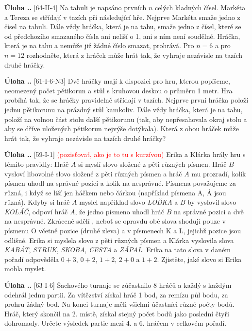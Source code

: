 \documentclass{article}
\newcounter{seminar}
\newcounter{problem}
\newcommand\todo[1]{\noindent\textcolor{red}{(#1)}}
\newcommand{\problem}[3]{
  \stepcounter{problem}
  \noindent\textbf{Úloha \theseminar .\theproblem.}
    [#1] #2
  \noindent#3
  \bigskip
}
\begin{document}
\problem{64-II-4}{
Na tabuli je napsáno prvních $n$ celých kladných čísel. Markéta a Tereza se střídají v tazích při následující hře. Nejprve Markéta smaže jedno z čísel na tabuli. Dále vždy hráčka, která je na tahu, smaže jedno z čísel, které se od předchozího smazaného čísla ani neliší o 1, ani s ním není soudělné. Hráčka, která je na tahu a nemůže již žádné číslo smazat, prohrává. Pro $n = 6$ a pro $n = 12$ rozhodněte, která z hráček může hrát tak, že vyhraje nezávisle na tazích druhé hráčky.
}{
}

\problem{61-I-6-N3}{
Dvě hráčky mají k dispozici pro hru, kterou popíšeme, neomezený počet pětikorun a stůl s kruhovou deskou o průměru 1 metr. Hra probíhá tak, že se hráčky pravidelně střídají v tazích. Nejprve první hráčka položí jednu pětikorunu na prázdný stůl kamkoliv. Dále vždy hráčka, která je na tahu, položí na volnou část stolu další pětikorunu (tak, aby nepřesahovala okraj stolu a aby se dříve uložených pětikorun nejvýše dotýkala). Která z obou hráček může hrát tak, že vyhraje nezávisle na tazích druhé hráčky?
}{
}

\problem{59-I-1}{
\todo{pozisťovať, ako je to tu s kurzívou} Erika a Klárka hrály hru \uv{slovní logik} s těmito pravidly: Hráč $A$ si myslí slovo složené z pěti různých písmen. Hráč $B$ vysloví libovolné slovo složené z pěti různých písmen a hráč $A$ mu prozradí, kolik písmen uhodl na správné pozici a kolik na nesprávné. Písmena považujeme za různá, i když se liší jen háčkem nebo čárkou (například písmena A, Á jsou různá). Kdyby si hráč $A$ myslel například slovo \textit{LOĎKA} a $B$ by vyslovil slovo \textit{KOLÁČ}, odpoví hráč $A$, že jedno písmeno uhodl hráč $B$ na správné pozici a dvě na nesprávné. Zkráceně sdělí \uv{1 + 2}, neboť se opravdu obě slova shodují pouze v písmenu O včetně pozice (druhé zleva) a v písmenech K a L, jejichž pozice jsou odlišné. Erika si myslela slovo z pěti různých písmen a Klárka vyslovila slova \textit{KABÁT}, \textit{STRUK}, \textit{SKOBA}, \textit{CESTA} a \textit{ZÁPAL}. Erika na tato slova v daném pořadí odpověděla $0 + 3$, $0 + 2$, $1 + 2$, $2 + 0$ a $1 + 2$. Zjistěte, jaké slovo si Erika mohla myslet.
}{
}

\problem{63-I-6}{
Šachového turnaje se zúčastnilo 8 hráčů a každý s každým odehrál jednu partii. Za vítězství získal hráč 1 bod, za remízu půl bodu, za prohru žádný bod. Na konci turnaje měli všichni účastníci různé počty bodů. Hráč, který skončil na 2. místě, získal stejný počet bodů jako poslední čtyři dohromady. Určete výsledek partie mezi 4. a 6. hráčem v celkovém pořadí.
}{
}
\end{document}

